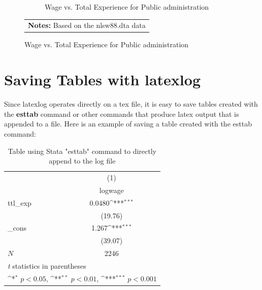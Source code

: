 \documentclass{article}
\begin{document}
\begin{figure}[H]
\begin{subfigure}{.3\textwidth}
  \caption{Wage vs. Total Experience for Public administration}
\end{subfigure}
\begin{tabular}{p{6in}}  
 \footnotesize \vspace{2pt} 
 \textbf{Notes:} Based on the nlsw88.dta data 
\end{tabular} 
\end{figure} 
\clearpage\pagebreak
\section{Saving Tables with latexlog}
Since latexlog operates directly on a tex file, it is easy to save 
tables created with the \textbf{esttab} command or other commands that 
produce latex output that is appended to a file.
Here is an example of saving a table created with the esttab command:
 
\vspace{10pt}
\begin{table}[htbp]\centering
\def\sym#1{\ifmmode^{#1}\else\(^{#1}\)\fi}
\caption{Table using Stata "esttab" command to directly append to the log file}
\begin{tabular}{l*{1}{c}}
\toprule
            &\multicolumn{1}{c}{(1)}\\
            &\multicolumn{1}{c}{logwage}\\
\midrule
ttl\_exp     &      0.0480\sym{***}\\
            &     (19.76)         \\
\addlinespace
\_cons      &       1.267\sym{***}\\
            &     (39.07)         \\
\midrule
\(N\)       &        2246         \\
\bottomrule
\multicolumn{2}{l}{\footnotesize \textit{t} statistics in parentheses}\\
\multicolumn{2}{l}{\footnotesize \sym{*} \(p<0.05\), \sym{**} \(p<0.01\), \sym{***} \(p<0.001\)}\\
\end{tabular}
\end{table}
\end{document}

